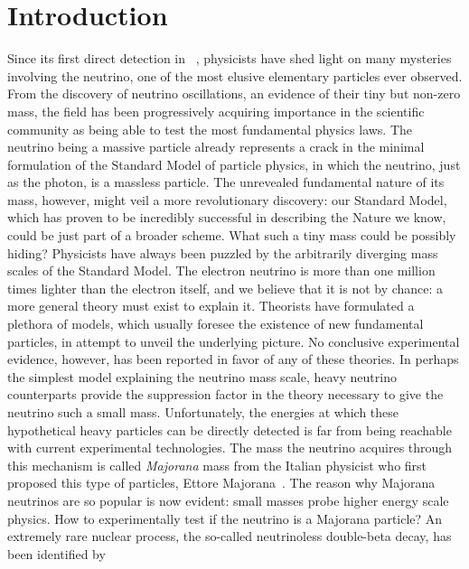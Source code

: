 
\chapter*{Introduction}%
\label{chap:introduction}

Since its first direct detection in ~\cite{Cowan1956}, physicists have shed light
on many mysteries involving the neutrino, one of the most elusive elementary particles
ever observed. From the discovery of neutrino oscillations, an evidence of their tiny but
non-zero mass, the field has been progressively acquiring importance in the scientific
community as being able to test the most fundamental physics laws. The neutrino being a
massive particle already represents a crack in the minimal formulation of the Standard
Model of particle physics, in which the neutrino, just as the photon, is a massless
particle. The unrevealed fundamental nature of its mass, however, might veil a more
revolutionary discovery: our Standard Model, which has proven to be incredibly
successful in describing the Nature we know, could be just part of a broader scheme.
\newpar
What such a tiny mass could be possibly hiding? Physicists have always been puzzled by the
arbitrarily diverging mass scales of the Standard Model. The electron neutrino is more
than one million times lighter than the electron itself, and we believe that it is not by
chance: a more general theory must exist to explain it. Theorists have formulated a
plethora of models, which usually foresee the existence of new fundamental particles, in
attempt to unveil the underlying picture. No conclusive experimental evidence, however,
has been reported in favor of any of these theories. In perhaps the simplest model
explaining the neutrino mass scale, heavy neutrino counterparts provide the suppression
factor in the theory necessary to give the neutrino such a small mass. Unfortunately, the
energies at which these hypothetical heavy particles can be directly detected is far from
being reachable with current experimental technologies. The mass the neutrino acquires
through this mechanism is called \emph{Majorana} mass from the Italian physicist who first
proposed this type of particles, Ettore Majorana~\cite{Majorana1932}. The reason why
Majorana neutrinos are so popular is now evident: small masses probe higher energy scale
physics.
\newpar
How to experimentally test if the neutrino is a Majorana particle? An extremely rare
nuclear process, the so-called neutrinoless double-beta decay, has been identified by
